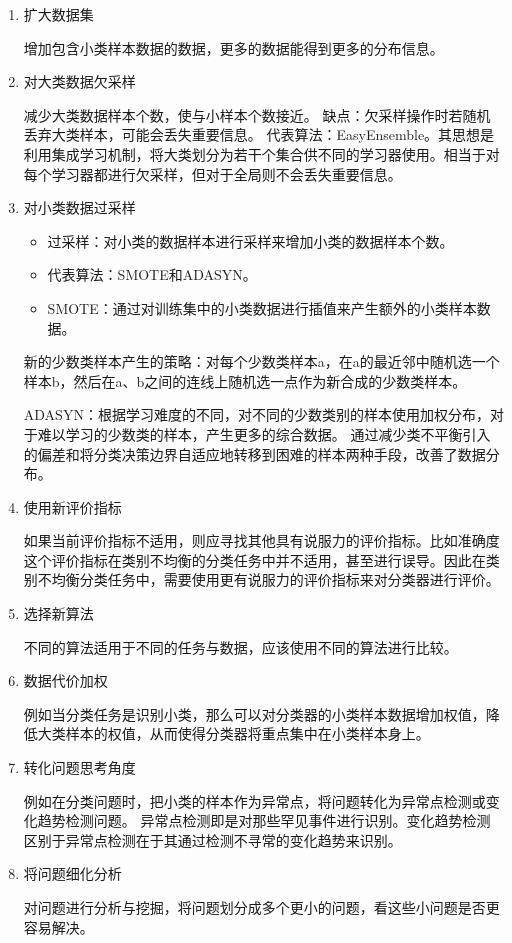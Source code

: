 \begin{enumerate}\itemsep0em
		\item 扩大数据集

			增加包含小类样本数据的数据，更多的数据能得到更多的分布信息。

		\item 对大类数据欠采样

			减少大类数据样本个数，使与小样本个数接近。
		缺点：欠采样操作时若随机丢弃大类样本，可能会丢失重要信息。
		代表算法：EasyEnsemble。其思想是利用集成学习机制，将大类划分为若干个集合供不同的学习器使用。相当于对每个学习器都进行欠采样，但对于全局则不会丢失重要信息。

	\item 对小类数据过采样

	\begin{itemize}\itemsep0em
			\item 过采样：对小类的数据样本进行采样来增加小类的数据样本个数。
			\item 代表算法：SMOTE和ADASYN。
			\item SMOTE：通过对训练集中的小类数据进行插值来产生额外的小类样本数据。
	\end{itemize}

		新的少数类样本产生的策略：对每个少数类样本a，在a的最近邻中随机选一个样本b，然后在a、b之间的连线上随机选一点作为新合成的少数类样本。

		ADASYN：根据学习难度的不同，对不同的少数类别的样本使用加权分布，对于难以学习的少数类的样本，产生更多的综合数据。 通过减少类不平衡引入的偏差和将分类决策边界自适应地转移到困难的样本两种手段，改善了数据分布。

	\item 使用新评价指标

		如果当前评价指标不适用，则应寻找其他具有说服力的评价指标。比如准确度这个评价指标在类别不均衡的分类任务中并不适用，甚至进行误导。因此在类别不均衡分类任务中，需要使用更有说服力的评价指标来对分类器进行评价。

	\item 选择新算法

		不同的算法适用于不同的任务与数据，应该使用不同的算法进行比较。

	\item 数据代价加权

		例如当分类任务是识别小类，那么可以对分类器的小类样本数据增加权值，降低大类样本的权值，从而使得分类器将重点集中在小类样本身上。

	\item 转化问题思考角度

		例如在分类问题时，把小类的样本作为异常点，将问题转化为异常点检测或变化趋势检测问题。 异常点检测即是对那些罕见事件进行识别。变化趋势检测区别于异常点检测在于其通过检测不寻常的变化趋势来识别。

	\item 将问题细化分析

		对问题进行分析与挖掘，将问题划分成多个更小的问题，看这些小问题是否更容易解决。
\end{enumerate}


